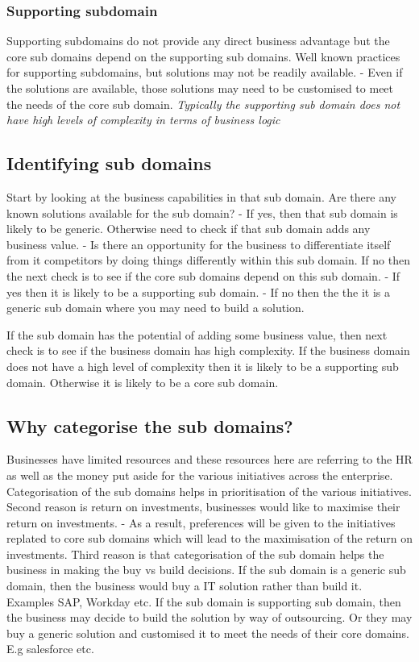 \documentclass[a4paper, 11pt]{book}
\begin{document}
    \subsubsection{Supporting subdomain}
    Supporting subdomains do not provide any direct business advantage but the core sub domains depend on the supporting sub domains.
    Well known practices for supporting subdomains, but solutions may not be readily available.
    - Even if the solutions are available, those solutions may need to be customised to meet the needs of the core sub domain.
    \textit{Typically the supporting sub domain does not have high levels of complexity in terms of business logic}

    \subsection{Identifying sub domains}
    Start by looking at the business capabilities in that sub domain.
    Are there any known solutions available for the sub domain?
    - If yes, then that sub domain is likely to be generic.
    Otherwise need to check if that sub domain adds any business value.
    - Is there an opportunity for the business to differentiate itself from it competitors by doing things differently within this sub domain.
    If no then the next check is to see if the core sub domains depend on this sub domain.
    - If yes then it is likely to be a supporting sub domain.
    - If no then the the it is a generic sub domain where you may need to build a solution.

    If the sub domain has the potential of adding some business value, then next check is to see if the business domain has high complexity.
    If the business domain does not have a high level of complexity then it is likely to be a supporting sub domain.
    Otherwise it is likely to be a core sub domain.

    \subsection{Why categorise the sub domains?}
    Businesses have limited resources and these resources here are referring to the HR as well as the money put aside for the various initiatives across the enterprise.
    Categorisation of the sub domains helps in prioritisation of the various initiatives.
    Second reason is return on investments, businesses would like to maximise their return on investments.
    - As a result, preferences will be given to the initiatives replated to core sub domains which will lead to the maximisation of the return on investments.
    Third reason is that categorisation of the sub domain helps the business in making the buy vs build decisions.
    If the sub domain is a generic sub domain, then the business would buy a IT solution rather than build it.
    Examples SAP, Workday etc.
    If the sub domain is supporting sub domain, then the business may decide to build the solution by way of outsourcing.
    Or they may buy a generic solution and customised it to meet the needs of their core domains. E.g salesforce etc.
\end{document}
